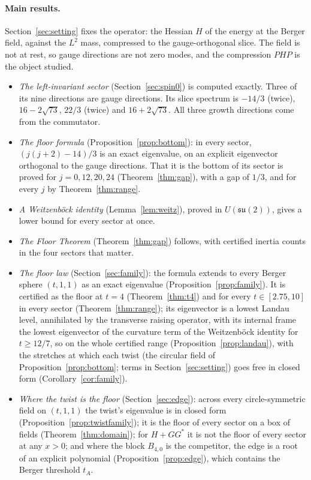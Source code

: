 \documentclass[11pt]{article}
\theoremstyle{definition}
\theoremstyle{remark}
\newif\ifredline
\newcommand{\redins}[1]{\ifredline{\color{blue}#1}\else#1\fi}
\newcommand{\su}{\mathfrak{su}(2)}
\begin{document}
\paragraph{Main results.} Section~\ref{sec:setting} fixes the operator: the Hessian $H$ of the energy
at the Berger field, against the $L^2$ mass, compressed to the gauge-orthogonal slice. The field is not
at rest, so gauge directions are not zero modes, and the compression $PHP$ is the object studied.
\begin{itemize}
  \item \emph{The left-invariant sector} (Section~\ref{sec:spin0}) is computed exactly. Three of its
    nine directions are gauge directions. Its slice spectrum is $-14/3$ (twice), $16-2\sqrt{73}$,
    $22/3$ (twice) and $16+2\sqrt{73}$. All three growth directions come from the commutator.
  \item \emph{The floor formula} (Proposition~\ref{prop:bottom}): in every sector, $(j(j+2)-14)/3$ is an
    exact eigenvalue, on an explicit eigenvector orthogonal to the gauge directions. That it is the bottom of
    its sector is proved for $j=0,12,20,24$ (Theorem~\ref{thm:gap}), with a gap of $1/3$, and for every $j$ by
    Theorem~\ref{thm:range}.
  \item \emph{A Weitzenb\"ock identity} (Lemma~\ref{lem:weitz}), proved in $U(\su)$, gives a lower
    bound for every sector at once.
  \item \emph{The Floor Theorem} (Theorem~\ref{thm:gap}) follows, with certified
    inertia counts in the four sectors that matter.
  \item \emph{The floor law} (Section~\ref{sec:family}): the formula extends to every Berger sphere $(t,1,1)$
    as an exact eigenvalue (Proposition~\ref{prop:family}). It is certified as the floor at $t=4$
    (Theorem~\ref{thm:t4}) and for every $t\in[2.75,10]$ in every sector
    (Theorem~\ref{thm:range}); its eigenvector is a lowest Landau level, annihilated by the transverse
    raising operator, with its internal frame the lowest eigenvector of the curvature term of the Weitzenb\"ock
    identity for $t\ge12/7$, so on the whole certified range
    (Proposition~\ref{prop:landau}),
    with the stretches at which each twist (the circular field of Proposition~\ref{prop:bottom}; terms in Section~\ref{sec:setting}) goes free in closed form (Corollary~\ref{cor:family}).
\redins{  \item \emph{Where the twist is the floor} (Section~\ref{sec:edge}): across every circle-symmetric field on
    $(t,1,1)$ the twist's eigenvalue is in closed form (Proposition~\ref{prop:twistfamily}); it is the floor of
    every sector on a box of fields (Theorem~\ref{thm:domain}); for $H+GG^*$ it is not the floor of every sector at any
    $x>0$; and where the block $B_{4,0}$ is the competitor, the edge is a root of an explicit polynomial
    (Proposition~\ref{prop:edge}), which contains the Berger threshold $t_A$.
}\end{itemize}
\end{document}
